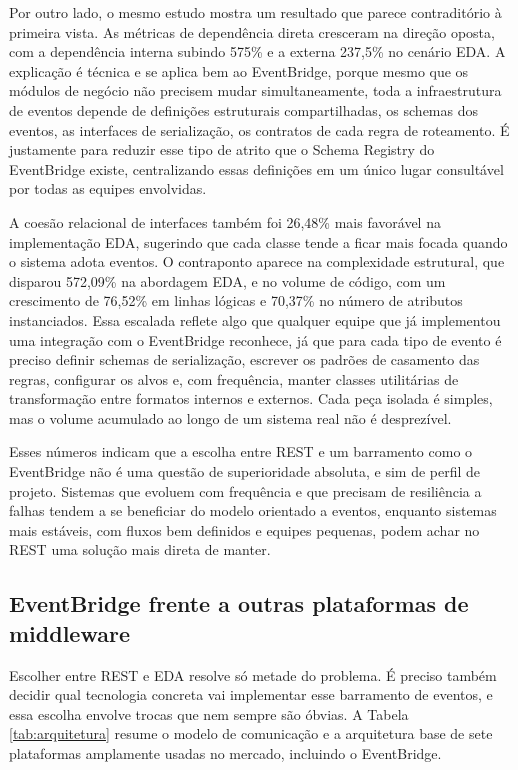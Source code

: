\documentclass[12pt, a4paper]{article}
\begin{document}
Por outro lado, o mesmo estudo mostra um resultado que parece contraditório à primeira vista. As métricas de dependência direta cresceram na direção oposta, com a dependência interna subindo 575\% e a externa 237,5\% no cenário EDA. A explicação é técnica e se aplica bem ao EventBridge, porque mesmo que os módulos de negócio não precisem mudar simultaneamente, toda a infraestrutura de eventos depende de definições estruturais compartilhadas, os schemas dos eventos, as interfaces de serialização, os contratos de cada regra de roteamento. É justamente para reduzir esse tipo de atrito que o Schema Registry do EventBridge existe, centralizando essas definições em um único lugar consultável por todas as equipes envolvidas.

A coesão relacional de interfaces também foi 26,48\% mais favorável na implementação EDA, sugerindo que cada classe tende a ficar mais focada quando o sistema adota eventos. O contraponto aparece na complexidade estrutural, que disparou 572,09\% na abordagem EDA, e no volume de código, com um crescimento de 76,52\% em linhas lógicas e 70,37\% no número de atributos instanciados. Essa escalada reflete algo que qualquer equipe que já implementou uma integração com o EventBridge reconhece, já que para cada tipo de evento é preciso definir schemas de serialização, escrever os padrões de casamento das regras, configurar os alvos e, com frequência, manter classes utilitárias de transformação entre formatos internos e externos. Cada peça isolada é simples, mas o volume acumulado ao longo de um sistema real não é desprezível.

Esses números indicam que a escolha entre REST e um barramento como o EventBridge não é uma questão de superioridade absoluta, e sim de perfil de projeto. Sistemas que evoluem com frequência e que precisam de resiliência a falhas tendem a se beneficiar do modelo orientado a eventos, enquanto sistemas mais estáveis, com fluxos bem definidos e equipes pequenas, podem achar no REST uma solução mais direta de manter.

\subsection{EventBridge frente a outras plataformas de middleware}

Escolher entre REST e EDA resolve só metade do problema. É preciso também decidir qual tecnologia concreta vai implementar esse barramento de eventos, e essa escolha envolve trocas que nem sempre são óbvias. A Tabela \ref{tab:arquitetura} resume o modelo de comunicação e a arquitetura base de sete plataformas amplamente usadas no mercado, incluindo o EventBridge.
\end{document}
